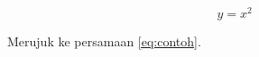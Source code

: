 \documentclass{article}
\begin{document}
\begin{equation}
   \label{eq:contoh}
   y=x^2
\end{equation}

Merujuk ke persamaan \ref{eq:contoh}. 
\end{document}
